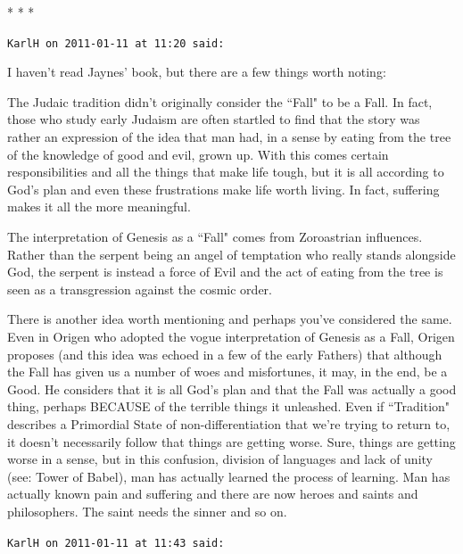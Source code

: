 
\begin{center}* * *\end{center}

\begin{footnotesize}\begin{sffamily}



\texttt{KarlH on 2011-01-11 at 11:20 said: }

I haven't read Jaynes' book, but there are a few things worth noting:

The Judaic tradition didn't originally consider the ``Fall" to be a Fall. In fact, those who study early Judaism are often startled to find that the story was rather an expression of the idea that man had, in a sense by eating from the tree of the knowledge of good and evil, grown up. With this comes certain responsibilities and all the things that make life tough, but it is all according to God's plan and even these frustrations make life worth living. In fact, suffering makes it all the more meaningful.

The interpretation of Genesis as a ``Fall" comes from Zoroastrian influences. Rather than the serpent being an angel of temptation who really stands alongside God, the serpent is instead a force of Evil and the act of eating from the tree is seen as a transgression against the cosmic order.

There is another idea worth mentioning and perhaps you've considered the same. Even in Origen who adopted the vogue interpretation of Genesis as a Fall, Origen proposes (and this idea was echoed in a few of the early Fathers) that although the Fall has given us a number of woes and misfortunes, it may, in the end, be a Good. He considers that it is all God's plan and that the Fall was actually a good thing, perhaps BECAUSE of the terrible things it unleashed. Even if ``Tradition" describes a Primordial State of non-differentiation that we're trying to return to, it doesn't necessarily follow that things are getting worse. Sure, things are getting worse in a sense, but in this confusion, division of languages and lack of unity (see: Tower of Babel), man has actually learned the process of learning. Man has actually known pain and suffering and there are now heroes and saints and philosophers. The saint needs the sinner and so on.


\hfill

\texttt{KarlH on 2011-01-11 at 11:43 said: }


\end{sffamily}
\end{footnotesize}
